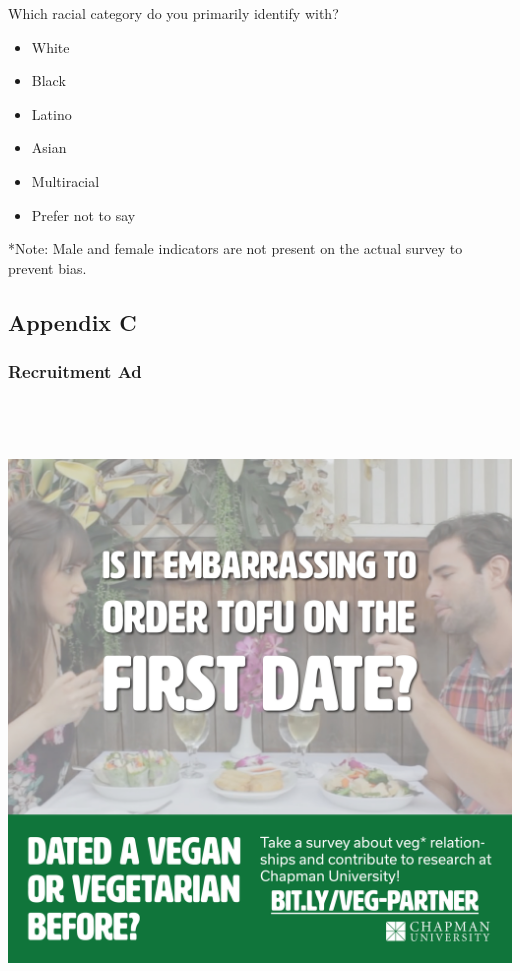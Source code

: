 \documentclass[twoside]{report}
\begin{document}
\begin{multicols}{2}
 Which racial category do you primarily identify with?

 \begin{itemize}
  \item
        White
 \end{itemize}

 \begin{itemize}
  \item
        Black
  \item
        Latino
  \item
        Asian
  \item
        Multiracial
  \item
        Prefer not to say
 \end{itemize}

 *Note: Male and female indicators are not present on the actual survey to prevent bias.

\end{multicols}
\hypertarget{appendix-c}{\subsection{Appendix C}}

\hypertarget{recruitment-ad}{%
 \subsubsection{Recruitment Ad}\label{recruitment-ad}}

\includegraphics[width=6.5in,height=6.5in]{images/soyboys.jpg}
\end{document}
